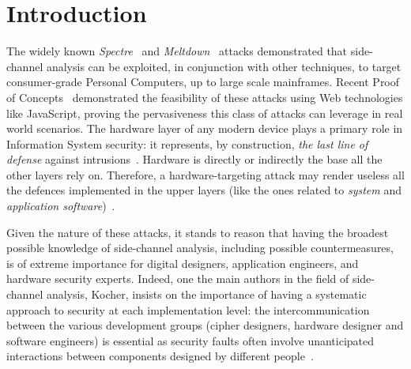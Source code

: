 \chapter{Introduction}\label{chap:intro}

The widely known \emph{Spectre}~\cite{kocher2019spectre} and \emph{Meltdown}~\cite{lipp2018meltdown} attacks demonstrated that side-channel analysis can be exploited, in conjunction with other techniques, to target consumer-grade Personal Computers, up to large scale mainframes. Recent Proof of Concepts~\cite{leakypage} demonstrated the feasibility of these attacks using Web technologies like JavaScript, proving the pervasiveness this class of attacks can leverage in real world scenarios. The hardware layer of any modern device plays a primary role in Information System security: it represents, by construction, \emph{the last line of defense} against intrusions~\cite{cosimo2018futuro}. Hardware is directly or indirectly the base all the other layers rely on. Therefore, a hardware-targeting attack may render useless all the defences implemented in the upper layers (like the ones related to \emph{system} and \emph{application software})~\cite{prinetto2020hardware}.

Given the nature of these attacks, it stands to reason that having the broadest possible knowledge of side-channel analysis, including possible countermeasures, is of extreme importance for digital designers, application engineers, and hardware security experts. Indeed, one the main authors in the field of side-channel analysis, Kocher, insists on the importance of having a systematic approach to security at each implementation level: the intercommunication between the various development groups (cipher designers, hardware designer and software engineers) is essential as security faults often involve unanticipated interactions between components designed by different people~\cite{kocher1999differential}.

